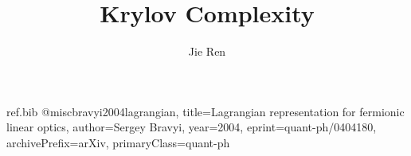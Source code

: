 \begin{filecontents*}{ref.bib}
@misc{bravyi2004lagrangian,
  title={Lagrangian representation for fermionic linear optics}, 
  author={Sergey Bravyi},
  year={2004},
  eprint={quant-ph/0404180},
  archivePrefix={arXiv},
  primaryClass={quant-ph}
}
\end{filecontents*}


\documentclass[aps,prx,superscriptaddress,nofootinbib]{revtex4-2}
\usepackage{amsfonts}
\usepackage{amsmath}
\usepackage{amsthm}
\usepackage{amssymb}
\usepackage{graphbox}
\usepackage{graphicx}
\usepackage{caption}
\usepackage{bm}
\usepackage{bbm}
\usepackage{cancel}
\usepackage{color}
\usepackage{mathrsfs}
\usepackage[colorlinks,bookmarks=true,citecolor=blue,linkcolor=red,urlcolor=blue]{hyperref}
\usepackage{simpler-wick}
\usepackage{appendix}
\usepackage{float}
\usepackage{array}
\usepackage{booktabs}
\usepackage[export]{adjustbox}
\usepackage[charsperline=120]{jlcode}
\setlength{\parindent}{10 pt}
\setlength{\parskip}{2 pt}
\setcounter{MaxMatrixCols}{30}

\newcommand{\RNum}[1]{\uppercase\expandafter{\romannumeral #1\relax}}
\newcommand{\normord}[1]{{:\mathrel{#1}:}}
\newcolumntype{M}[1]{>{\centering\arraybackslash}m{#1}}
\def\tbs{\textbackslash}
\def \tr{\operatorname{tr}}
\def \Tr{\operatorname{Tr}}
\def \Pf{\operatorname{Pf}}

\newtheorem{theorem}{Theorem}
\newtheorem{definition}{Definition}




\title{Krylov Complexity}
\author{Jie Ren}


\maketitle


\tableofcontents


\section{Operator growth}

In this section, we will first consider the operator dynamics under the Heisenberg picture, i.e., $\partial_t O = -i [H,O]$.
\subsection{Lanczos iteration}














